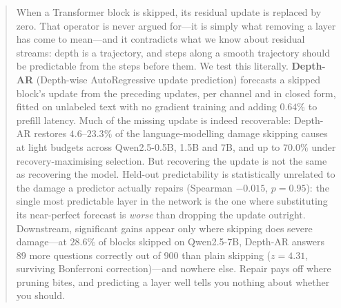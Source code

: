 \begin{abstract}
When a Transformer block is skipped, its residual update is replaced by zero.
That operator is never argued for---it is simply what removing a layer has
come to mean---and it contradicts what we know about residual streams: depth
is a trajectory, and steps along a smooth trajectory should be predictable
from the steps before them. We test this literally. \textbf{Depth-AR}
(Depth-wise AutoRegressive update prediction) forecasts a skipped block's
update from the preceding updates, per channel and in closed form, fitted on
unlabeled text with no gradient training and adding $0.64\%$ to prefill
latency. Much of the missing update is indeed recoverable: Depth-AR restores
$4.6$--$23.3\%$ of the language-modelling damage skipping causes at light
budgets across Qwen2.5-0.5B, 1.5B and 7B, and up to $70.0\%$ under
recovery-maximising selection. But recovering the update is not the same as
recovering the model. Held-out predictability is statistically unrelated to
the damage a predictor actually repairs (Spearman $-0.015$, $p = 0.95$): the
single most predictable layer in the network is the one where substituting
its near-perfect forecast is \emph{worse} than dropping the update outright.
Downstream, significant gains appear only where skipping does severe
damage---at $28.6\%$ of blocks skipped on Qwen2.5-7B, Depth-AR answers $89$
more questions correctly out of $900$ than plain skipping ($z = 4.31$,
surviving Bonferroni correction)---and nowhere else. Repair pays off where
pruning bites, and predicting a layer well tells you nothing about whether
you should.
\end{abstract}